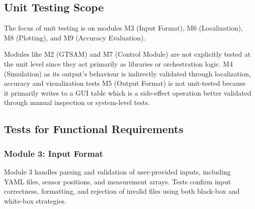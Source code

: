 \documentclass[12pt, titlepage]{article}
\begin{document}
\subsection{Unit Testing Scope}
The focus of unit testing is on modules M3 (Input Format), M6 (Localization), M8 (Plotting), and M9 (Accuracy Evaluation).

Modules like M2 (GTSAM) and M7 (Control Module) are not explicitly tested at the unit level since they act primarily as libraries or orchestration logic. M4 (Simulation) as its output's behaviour is indirectly validated through localization, accuracy and visualization tests M5 (Output Format) is not unit-tested because it primarily writes to a GUI table which is a side-effect operation better validated through manual inspection or system-level tests.

\subsection{Tests for Functional Requirements}

\subsubsection{Module 3: Input Format}

Module 3 handles parsing and validation of user-provided inputs, including YAML files, sensor positions, and measurement arrays. Tests confirm input correctness, formatting, and rejection of invalid files using both black-box and white-box strategies.
\end{document}
